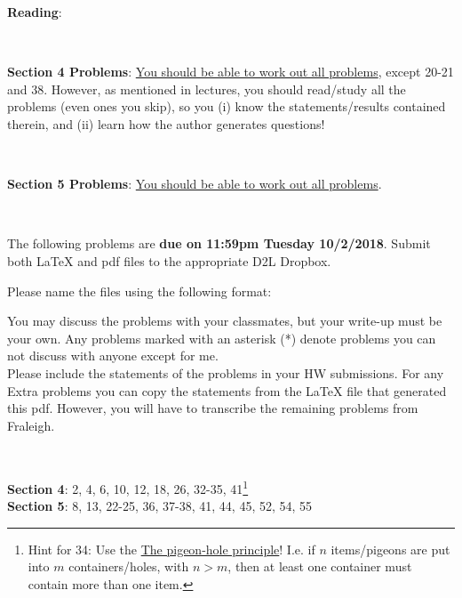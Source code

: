 \documentclass[12pt]{article}
\begin{document}
{\bf Reading}: 

\

{\bf Section 4 Problems}: \underline{You should be able to work out all problems}, except 20-21 and 38. However, as mentioned in lectures, you should read/study all the problems (even ones you skip), so you (i) know the statements/results contained therein, and (ii) learn how the author generates questions!

\

{\bf Section 5 Problems}: \underline{You should be able to work out all problems}.


\hrulefill

\

The following problems are {\bf due on 11:59pm Tuesday 10/2/2018}.  Submit both LaTeX and pdf files to the appropriate D2L Dropbox. 

Please name the files using the following format:
\begin{center}
\end{center}

You may discuss the problems with your classmates, but your write-up must be your own.  Any problems marked with an asterisk (*) denote problems you can not discuss with anyone except for me.\\

Please include the statements of the problems in your HW submissions. For any Extra problems you can copy the statements from the LaTeX file that generated this pdf. However, you will have to transcribe the remaining problems from Fraleigh.

\

\textbf{Section 4}: 2, 4, 6, 10, 12, 18, 26, 32-35, 41\footnote{Hint for 34: Use the \href{https://en.wikipedia.org/wiki/Pigeonhole_principle}{The pigeon-hole principle}! I.e. if $n$ items/pigeons are put into $m$ containers/holes, with $n > m$, then at least one container must contain more than one item.}\\
\textbf{Section 5}: 8, 13, 22-25, 36, 37-38, 41, 44, 45, 52, 54, 55\\
\end{document}
